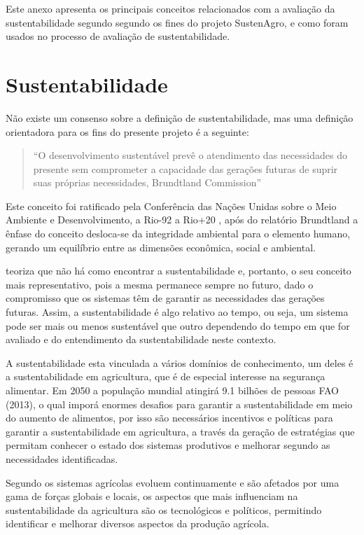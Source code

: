 Este anexo apresenta os principais conceitos relacionados com a avaliação
da sustentabilidade segundo segundo os fines do projeto SustenAgro,
e como foram usados no processo de avaliação de sustentabilidade.

\section{Sustentabilidade}

Não existe um consenso sobre a definição de sustentabilidade, mas
uma definição orientadora para os fins do presente projeto é a seguinte:
\begin{quotation}
``O desenvolvimento sustentável prevê o atendimento das necessidades
do presente sem comprometer a capacidade das gerações futuras de suprir
suas próprias necessidades, \foreignlanguage{english}{Brundtland Commission}''
\citet{Burton:1987,brundtland1987our}
\end{quotation}
Este conceito foi ratificado pela Conferência das Nações Unidas sobre
o Meio Ambiente e Desenvolvimento, a Rio-92 \citet{ehlers1996agricultura}
a Rio+20 \citet{ONU2012}, após do relatório \foreignlanguage{english}{Brundtland}
a ênfase do conceito desloca-se da integridade ambiental para o elemento
humano, gerando um equilíbrio entre as dimensões econômica, social
e ambiental\citet{van2005indicadores}.

\citet{gliessman2001agroecologia} teoriza que não há como encontrar
a sustentabilidade e, portanto, o seu conceito mais representativo,
pois a mesma permanece sempre no futuro, dado o compromisso que os
sistemas têm de garantir as necessidades das gerações futuras. Assim,
a sustentabilidade é algo relativo ao tempo, ou seja, um sistema pode
ser mais ou menos sustentável que outro dependendo do tempo em que
for avaliado e do entendimento da sustentabilidade neste contexto.

A sustentabilidade esta vinculada a vários domínios de conhecimento,
um deles é a sustentabilidade em agricultura, que é de especial interesse
na segurança alimentar. Em 2050 a população mundial atingirá 9.1 bilhões
de pessoas FAO (2013), o qual imporá enormes desafios para garantir
a sustentabilidade em meio do aumento de alimentos, por isso são necessários
incentivos e políticas para garantir a sustentabilidade em agricultura,
a través da geração de estratégias que permitam conhecer o estado
dos sistemas produtivos e melhorar segundo as necessidades identificadas.

Segundo \citet{van2008integrated} os sistemas agrícolas evoluem continuamente
e são afetados por uma gama de forças globais e locais, os aspectos
que mais influenciam na sustentabilidade da agricultura são os tecnológicos
e políticos, permitindo identificar e melhorar diversos aspectos da
produção agrícola. 

